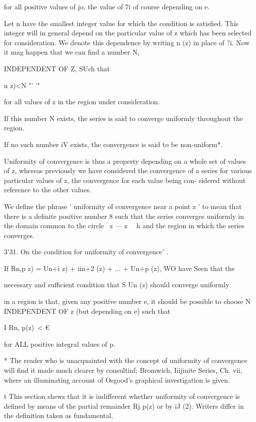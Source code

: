 for all positive values of jo, the value of 7i of course depending on e. 

Let n have the smallest integer value for which the condition is satisfied. 
This integer will in general depend on the particular value of z which has 
been selected for consideration. We denote this dependence by writing 
n (z) in place of ?i. Now it mag happen that we can find a number N, 

INDEPENDENT OF Z, SUch that 

n z)<N "'  '"  

for all values of z in the region under consideration. 

If this number N exists, the series is said to converge uniformly 
throughout the region. 

If no such number iV exists, the convergence is said to be non-uniform*. 

Uniformity of convergence is thus a property depending on a whole set of 
values of z, whereas previously we have considered the convergence of a series 
for various particular values of z, the convergence for each value being con- 
sidered without reference to the other values. 

We define the phrase ' uniformity of convergence near a point z ' to mean 
that there is a definite positive number 8 such that the series converges 
uniformly in the domain common to the circle \ z — z \ \  h and the region in 
which the series converges. 

3'31. On the condition for uniformity of convergence' . 

If Rn,p  z) = Un+i  z) + iin+2 (z) + ... + Un+p (z), WO have Seen that the 

necessary and sufficient condition that S Un (z) should converge uniformly 

in a region is that, given any positive number e, it should be possible to 
choose N INDEPENDENT OF z (but depending on e) such that 

I Rn, p(z)\ < € 

for ALL positive integral values of p. 

* The reader who is unacquainted with the concept of uniformity of convergence will find it 
made much clearer by consultinf; Bromwich, Iiijinite Series, Ch. vii, where an illuminating 
account of Osgood's graphical investigation is given. 

t This section shews that it is indifferent whether uniformity of convergence is defined by 
means of the partial remainder Rj p(z) or by iJ (2). Writers differ in the definition taken 
as fundamental. 



